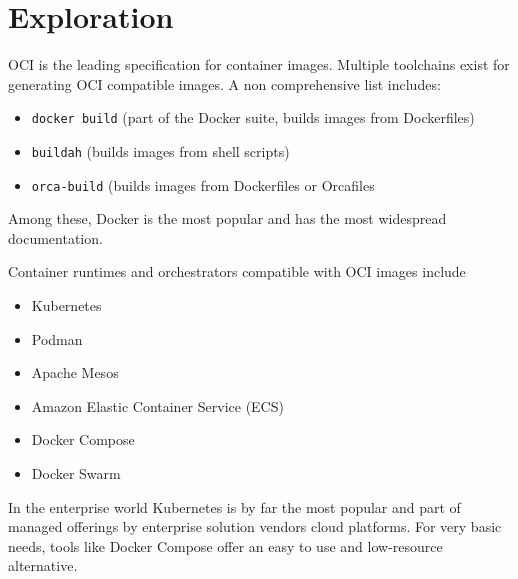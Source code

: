 \documentclass[12pt, letterpaper, twoside]{article}
\begin{document}
\section{Exploration}
\label{sec:explore}

OCI is the leading specification for container images. Multiple toolchains exist for generating OCI compatible images. A non comprehensive list includes:
\begin{itemize}
    \item \verb|docker build| (part of the Docker suite, builds images from Dockerfiles)
    \item \verb|buildah| (builds images from shell scripts)
    \item \verb|orca-build| (builds images from Dockerfiles or Orcafiles
\end{itemize}
Among these, Docker is the most popular and has the most widespread documentation.

Container runtimes and orchestrators compatible with OCI images include
\begin{itemize}
    \item Kubernetes
    \item Podman
    \item Apache Mesos
    \item Amazon Elastic Container Service (ECS)
    \item Docker Compose
    \item Docker Swarm
\end{itemize}
In the enterprise world Kubernetes is by far the most popular and part of managed offerings by enterprise solution vendors cloud platforms. For very basic needs, tools like Docker Compose offer an easy to use and low-resource alternative.
\end{document}
